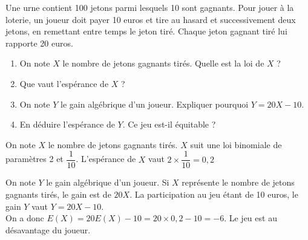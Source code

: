 \documentclass[11pt,fleqn, openany]{book} %
\begin{document}
\begin{exercise}
Une urne contient 100 jetons parmi lesquels 10 sont gagnants. Pour jouer à la loterie, un joueur doit payer 10 euros et tire au hasard et successivement deux jetons, en remettant entre temps le jeton tiré. Chaque jeton gagnant tiré lui rapporte 20 euros.

\begin{enumerate}
\item On note $X$ le nombre de jetons gagnants tirés. Quelle est la loi de $X$ ?
\item Que vaut l'espérance de $X$ ?
\item On note $Y$ le gain algébrique d'un joueur. Expliquer pourquoi $Y=20X-10$.
\item En déduire l'espérance de $Y$. Ce jeu est-il équitable ?
\end{enumerate}\newpage \end{exercise}

\begin{solution}On note $X$ le nombre de jetons gagnants tirés. $X$ suit une loi binomiale de paramètres 2 et $\dfrac{1}{10}$. L'espérance de $X$ vaut $2 \times \dfrac{1}{10}=0,2$

On note $Y$ le gain algébrique d'un joueur. Si $X$ représente le nombre de jetons gagnants tirés, le gain est de $20 X$. La participation au jeu étant de 10 euros, le gain $Y$ vaut $Y=20X-10$. \\On a donc $E(X)=20 E(X)-10=20 \times 0,2 -10 = -6$. Le jeu est au désavantage du joueur.\end{solution}
\end{document}
